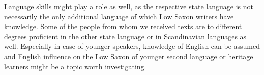 \documentclass[output=paper,colorlinks,citecolor=brown]{langscibook}
\begin{document}
Language skills might play a role as well, as the respective state language is not necessarily the only additional language of which Low Saxon writers have knowledge. 
Some of the people from whom we received texts are to different degrees proficient in the other state language or in Scandinavian languages as well. Especially in case of younger speakers, knowledge of English can be assumed and English influence on the Low Saxon of younger second language or heritage learners might be a topic worth investigating. 



\end{document}
